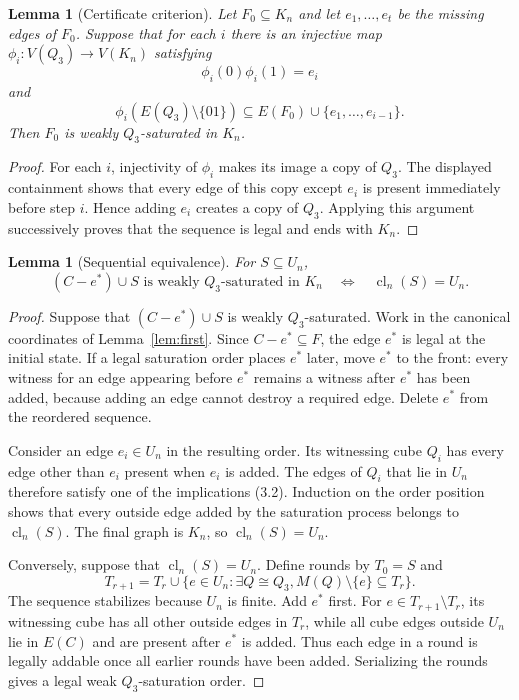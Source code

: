 \documentclass[11pt]{article}
\numberwithin{equation}{section}
\newtheorem{lemma}[theorem]{Lemma}
\newcommand{\cl}{\operatorname{cl}}
\begin{document}
\begin{lemma}[Certificate criterion]\label{lem:certificate}
Let $F_0\subseteq K_n$ and let $e_1,\ldots,e_t$ be the missing edges of $F_0$. Suppose that for each $i$ there is an injective map $\phi_i:V(Q_3)\to V(K_n)$ satisfying
\[
\phi_i(0)\phi_i(1)=e_i
\]
and
\[
\phi_i(E(Q_3)\setminus\{01\})\subseteq E(F_0)\cup\{e_1,\ldots,e_{i-1}\}.
\]
Then $F_0$ is weakly $Q_3$-saturated in $K_n$.
\end{lemma}

\begin{proof}
For each $i$, injectivity of $\phi_i$ makes its image a copy of $Q_3$. The displayed containment shows that every edge of this copy except $e_i$ is present immediately before step $i$. Hence adding $e_i$ creates a copy of $Q_3$. Applying this argument successively proves that the sequence is legal and ends with $K_n$.
\end{proof}

\begin{lemma}[Sequential equivalence]\label{lem:seq}
For $S\subseteq U_n$,
\[
(C-e^*)\cup S\text{ is weakly $Q_3$-saturated in }K_n
\quad\Longleftrightarrow\quad
\cl_n(S)=U_n.
\]
\end{lemma}

\begin{proof}
Suppose that $(C-e^*)\cup S$ is weakly $Q_3$-saturated. Work in the
canonical coordinates of Lemma~\ref{lem:first}. Since $C-e^*\subseteq F$,
the edge $e^*$ is legal at the initial state. If a legal saturation order places
$e^*$ later, move $e^*$ to the front: every witness for an edge appearing before
$e^*$ remains a witness after $e^*$ has been added, because adding an edge cannot
destroy a required edge. Delete $e^*$ from the reordered sequence.

Consider an edge $e_i\in U_n$ in the resulting order. Its witnessing cube
$Q_i$ has every edge other than $e_i$ present when $e_i$ is added. The edges of
$Q_i$ that lie in $U_n$ therefore satisfy one of the implications (3.2).
Induction on the order position shows that every outside edge added by the
saturation process belongs to $\cl_n(S)$. The final graph is $K_n$, so
$\cl_n(S)=U_n$.

Conversely, suppose that $\cl_n(S)=U_n$. Define rounds by
$T_0=S$ and
\[
T_{r+1}=T_r\cup\{e\in U_n:\exists Q\cong Q_3,
M(Q)\setminus\{e\}\subseteq T_r\}.
\]
The sequence stabilizes because $U_n$ is finite. Add $e^*$ first. For
$e\in T_{r+1}\setminus T_r$, its witnessing cube has all other outside
edges in $T_r$, while all cube edges outside $U_n$ lie in $E(C)$ and are
present after $e^*$ is added. Thus each edge in a round is legally addable
once all earlier rounds have been added. Serializing the rounds gives a legal
weak $Q_3$-saturation order.
\end{proof}
\end{document}
